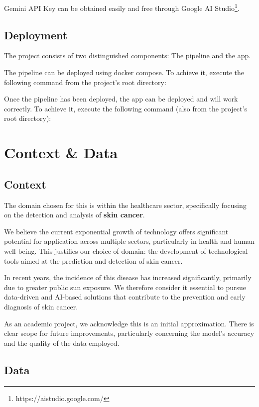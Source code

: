 \documentclass[12pt]{article}
\begin{document}
Gemini API Key can be obtained easily and free through Google AI Studio\footnote{https://aistudio.google.com/}.

\subsection{Deployment}
The project consists of two distinguished components: The pipeline and the app.

The pipeline can be deployed using docker compose. To achieve it, execute the following command from the project's root directory:

Once the pipeline has been deployed, the app can be deployed and will work correctly. To achieve it, execute the following command (also from the project's root directory):



\newpage

\section{Context \& Data}

\subsection{Context}
The domain chosen for this is within the healthcare sector, specifically focusing on the detection and analysis of \textbf{skin cancer}.

We believe the current exponential growth of technology offers significant potential for application across multiple sectors, particularly in health and human well-being. This justifies our choice of domain: the development of technological tools aimed at the prediction and detection of skin cancer.

In recent years, the incidence of this disease has increased significantly, primarily due to greater public sun exposure. We therefore consider it essential to pursue data-driven and AI-based solutions that contribute to the prevention and early diagnosis of skin cancer.

As an academic project, we acknowledge this is an initial approximation. There is clear scope for future improvements, particularly concerning the model's accuracy and the quality of the data employed.

\subsection{Data}
\end{document}
